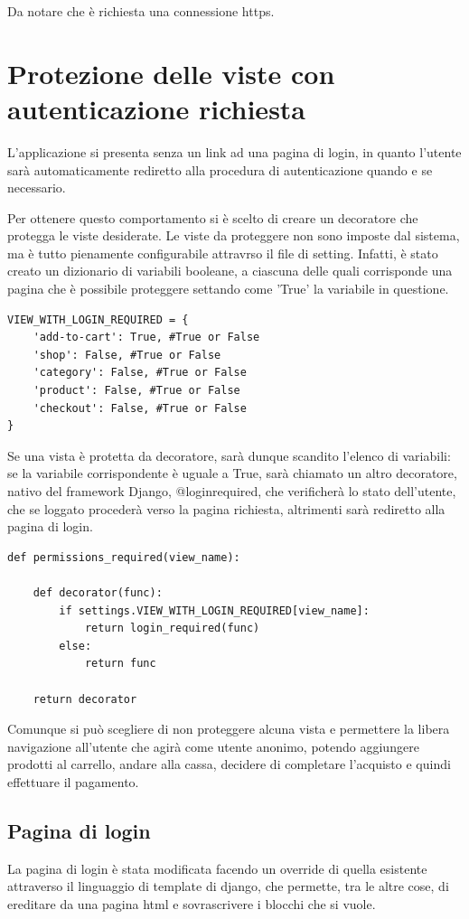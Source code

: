Da notare che è richiesta una connessione https.

\section{Protezione delle viste con autenticazione richiesta}
L'applicazione si presenta senza un link ad una pagina di login, in quanto l'utente sarà automaticamente rediretto alla procedura di autenticazione quando e se necessario. 

Per ottenere questo comportamento si è scelto di creare un decoratore che protegga le viste desiderate.
Le viste da proteggere non sono imposte dal sistema, ma è tutto pienamente configurabile attravrso il file di setting. Infatti, è stato creato un dizionario di variabili booleane, a ciascuna delle quali corrisponde una pagina che è possibile proteggere settando come 'True' la variabile in questione.

\begin{lstlisting}
VIEW_WITH_LOGIN_REQUIRED = {
    'add-to-cart': True, #True or False
    'shop': False, #True or False
    'category': False, #True or False
    'product': False, #True or False
    'checkout': False, #True or False
}
\end{lstlisting}

Se una vista è protetta da decoratore, sarà dunque scandito l'elenco di variabili: se la variabile corrispondente è uguale a True, sarà chiamato un altro decoratore, nativo del framework Django, @login\textunderscore required, che verificherà lo stato dell'utente, che se loggato procederà verso la pagina richiesta, altrimenti sarà rediretto alla pagina di login.

\begin{lstlisting}
def permissions_required(view_name):
    
    def decorator(func):
        if settings.VIEW_WITH_LOGIN_REQUIRED[view_name]:
            return login_required(func)
        else:
            return func

    return decorator
\end{lstlisting}

Comunque si può scegliere di non proteggere alcuna vista e permettere la libera navigazione all'utente che agirà come utente anonimo, potendo aggiungere prodotti al carrello, andare alla cassa, decidere di completare l'acquisto e quindi effettuare il pagamento.

\subsection{Pagina di login}
La pagina di login è stata modificata facendo un override di quella esistente attraverso il linguaggio di template di django, che permette, tra le altre cose, di ereditare da una pagina html e sovrascrivere i blocchi che si vuole.

